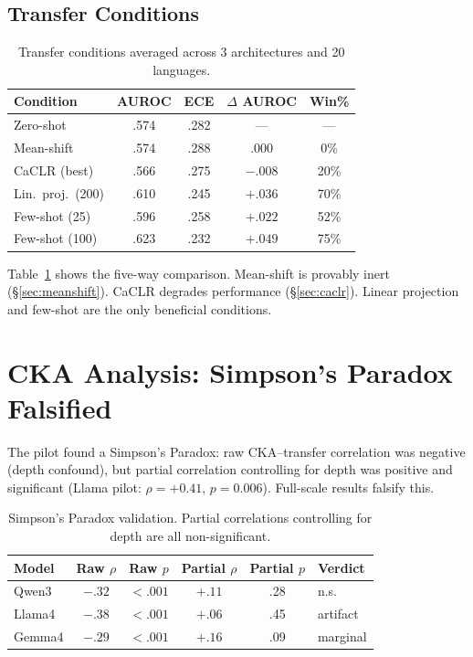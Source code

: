\documentclass[11pt,a4paper]{article}
\begin{document}
\subsection{Transfer Conditions}

\begin{table}[t]
\centering
\small
\caption{Transfer conditions averaged across 3 architectures and 20 languages.}
\label{tab:transfer_5way}
\begin{tabular}{lcccc}
\toprule
Condition & AUROC & ECE & $\Delta$ AUROC & Win\% \\
\midrule
Zero-shot & .574 & .282 & --- & --- \\
Mean-shift & .574 & .288 & .000 & 0\% \\
CaCLR (best) & .566 & .275 & $-.008$ & 20\% \\
Lin.\ proj.\ (200) & .610 & .245 & $+.036$ & 70\% \\
Few-shot (25) & .596 & .258 & $+.022$ & 52\% \\
Few-shot (100) & .623 & .232 & $+.049$ & 75\% \\
\bottomrule
\end{tabular}
\end{table}

Table~\ref{tab:transfer_5way} shows the five-way comparison.
Mean-shift is provably inert (\S\ref{sec:meanshift}).
CaCLR degrades performance (\S\ref{sec:caclr}).
Linear projection and few-shot are the only beneficial conditions.

\section{CKA Analysis: Simpson's Paradox Falsified}
\label{sec:cka}

The pilot found a Simpson's Paradox: raw CKA--transfer correlation was negative (depth confound), but partial correlation controlling for depth was positive and significant (Llama pilot: $\rho{=}+0.41$, $p{=}0.006$).
Full-scale results falsify this.

\begin{table}[t]
\centering
\small
\caption{Simpson's Paradox validation. Partial correlations controlling for depth are all non-significant.}
\label{tab:simpson}
\begin{tabular}{lccccl}
\toprule
Model & Raw $\rho$ & Raw $p$ & Partial $\rho$ & Partial $p$ & Verdict \\
\midrule
Qwen3 & $-.32$ & ${<}.001$ & $+.11$ & .28 & n.s. \\
Llama4 & $-.38$ & ${<}.001$ & $+.06$ & .45 & artifact \\
Gemma4 & $-.29$ & ${<}.001$ & $+.16$ & .09 & marginal \\
\bottomrule
\end{tabular}
\end{table}
\end{document}
